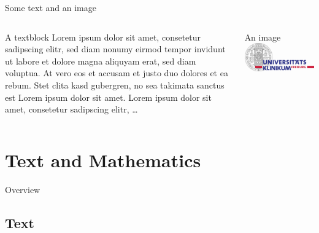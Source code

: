 \begin{frame}{Some text and an image}
\begin{columns}[T]
    \begin{column}{.5\textwidth}
     \begin{block}{A textblock}
		Lorem ipsum dolor sit amet, consetetur sadipscing elitr, sed diam nonumy eirmod tempor invidunt ut labore et dolore magna aliquyam erat, sed diam voluptua. At vero eos et accusam et justo duo dolores et ea rebum. Stet clita kasd gubergren, no sea takimata sanctus est Lorem ipsum dolor sit amet. Lorem ipsum dolor sit amet, consetetur sadipscing elitr, \dots
    \end{block}
    \end{column}
    \begin{column}{.5\textwidth}
    \begin{block}{An image}
    \includegraphics[width=\textwidth]{img/logo_uniklinik-freiburg-im-breisgau.jpg}
    \end{block}
    \end{column}
  \end{columns}
\end{frame}




\section{Text and Mathematics}


\begin{frame}{Overview}
\tableofcontents[currentsection]
\end{frame}

\subsection{Text}

